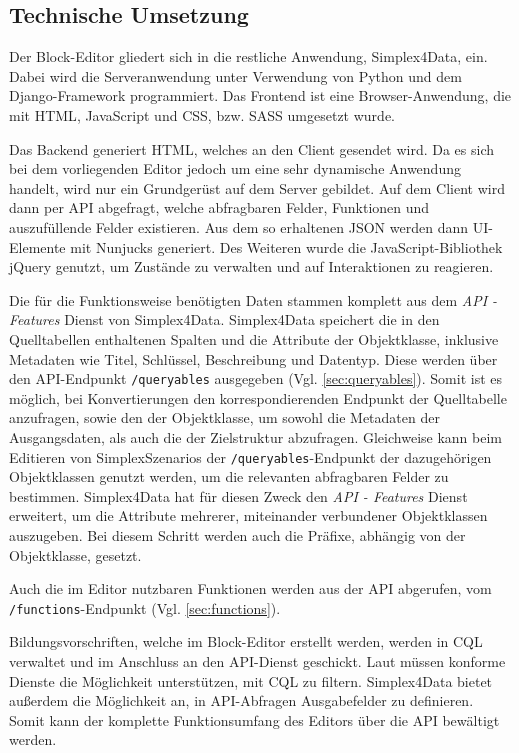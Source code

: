 \subsection{Technische Umsetzung}
Der Block-Editor gliedert sich in die restliche Anwendung, Simplex4Data, ein. Dabei wird die Serveranwendung unter Verwendung von Python und dem Django-Framework \parencite{djangosoftwarefoundationDjango} programmiert. Das Frontend ist eine Browser-Anwendung, die mit \ac{HTML}, JavaScript und \ac{CSS}, bzw. \ac{SASS} umgesetzt wurde.

Das Backend generiert \ac{HTML}, welches an den Client gesendet wird. Da es sich bei dem vorliegenden Editor jedoch um eine sehr dynamische Anwendung handelt, wird nur ein Grundgerüst auf dem Server gebildet. Auf dem Client wird dann per \ac{API} abgefragt, welche abfragbaren Felder, Funktionen und auszufüllende Felder existieren. Aus dem so erhaltenen \ac{JSON} werden dann UI-Elemente mit Nunjucks \parencite{mozillaNunjucks} generiert. Des Weiteren wurde die JavaScript-Bibliothek jQuery \parencite{openjsfoundationJQuery} genutzt, um Zustände zu verwalten und auf Interaktionen zu reagieren.

Die für die Funktionsweise benötigten Daten stammen komplett aus dem \textit{API - Features} Dienst \parencite{ogcAPI} von Simplex4Data. Simplex4Data speichert die in den Quelltabellen enthaltenen Spalten und die Attribute der Objektklasse, inklusive Metadaten wie Titel, Schlüssel, Beschreibung und Datentyp. Diese werden über den \ac{API}-Endpunkt \texttt{/queryables} ausgegeben (Vgl. \ref{sec:queryables}). Somit ist es möglich, bei Konvertierungen den korrespondierenden Endpunkt der Quelltabelle anzufragen, sowie den der Objektklasse, um sowohl die Metadaten der Ausgangsdaten, als auch die der Zielstruktur abzufragen. Gleichweise kann beim Editieren von SimplexSzenarios der \texttt{/queryables}-Endpunkt der dazugehörigen Objektklassen genutzt werden, um die relevanten abfragbaren Felder zu bestimmen. Simplex4Data hat für diesen Zweck den \textit{API - Features} Dienst erweitert, um die Attribute mehrerer, miteinander verbundener Objektklassen auszugeben. Bei diesem Schritt werden auch die Präfixe, abhängig von der Objektklasse, gesetzt.

Auch die im Editor nutzbaren Funktionen werden aus der \ac{API} abgerufen, vom \texttt{/functions}-Endpunkt (Vgl. \ref{sec:functions}).

Bildungsvorschriften, welche im Block-Editor erstellt werden, werden in \ac{CQL} verwaltet und im Anschluss an den \ac{API}-Dienst geschickt. Laut  müssen konforme Dienste die Möglichkeit unterstützen, mit \ac{CQL} zu filtern. Simplex4Data bietet außerdem die Möglichkeit an, in \ac{API}-Abfragen Ausgabefelder zu definieren. Somit kann der komplette Funktionsumfang des Editors über die \ac{API} bewältigt werden.

